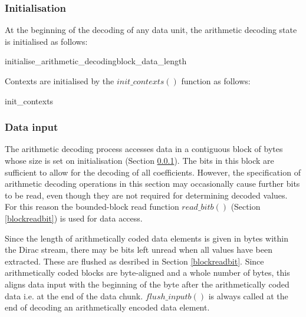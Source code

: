 \subsubsection{Initialisation}
\label{initarith}

At the beginning of the decoding of any data unit, the arithmetic
decoding state is initialised as follows:

\begin{pseudo}{initialise\_arithmetic\_decoding}{block\_data\_length}
\bsEND
{}
\end{pseudo}

Contexts are initialised by the $init\_contexts()$ function as follows:

\begin{pseudo}{init\_contexts}{}
\bsEND
\end{pseudo}

\subsubsection{Data input}
\label{inputarith}

The arithmetic decoding process accesses data in a contiguous block of bytes
whose size is set on initialisation (Section \ref{initarith}). The bits in this
block are sufficient to allow for the
decoding of all coefficients. However, the specification of arithmetic
decoding operations in this section may occasionally cause further bits to be read,
even though they are not required for determining decoded values. For this
reason the bounded-block read function $read\_bitb()$ (Section \ref{blockreadbit}) is 
used for data access.

Since the length of arithmetically coded data elements is given in bytes within the Dirac
stream, there may be bits left unread when all values have been extracted. These
are flushed as desribed in Section \ref{blockreadbit}. Since arithmetically coded blocks
are byte-aligned and a whole number of bytes, this aligns data input with the beginning of the byte 
after the arithmetically coded data i.e. at the end of the
data chunk. $flush\_inputb()$ is always called at the end of decoding an arithmetically encoded
data element.

